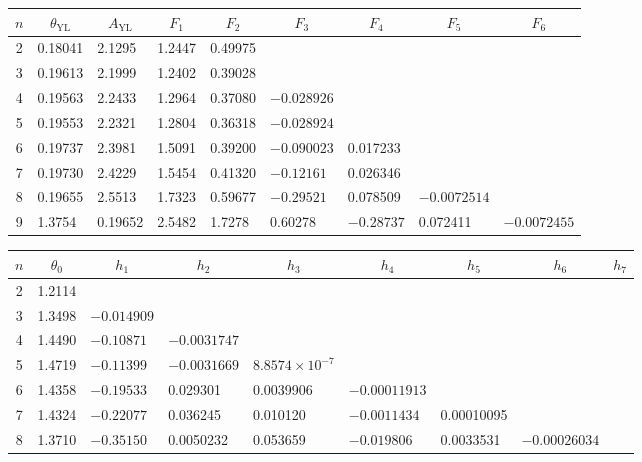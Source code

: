 \documentclass[
aps,
pre,
preprint,
longbibliography,
floatfix
]{revtex4-2}
\begin{document}
\begin{table}
  \singlespacing
  \begin{tabular}{c|llllllll}
    \multicolumn{1}{c|}{$n$} &
     \multicolumn{1}{c}{$\theta_\mathrm{YL}$} &
     \multicolumn{1}{c}{$A_\mathrm{YL}$} &
     \multicolumn{1}{c}{$F_1$} &
     \multicolumn{1}{c}{$F_2$} &
     \multicolumn{1}{c}{$F_3$} &
     \multicolumn{1}{c}{$F_4$} &
     \multicolumn{1}{c}{$F_5$} &
     \multicolumn{1}{c}{$F_6$} \\
    \hline
      2 &
      0.18041 &
      2.1295 &
      1.2447 &
      0.49975 \\
      3 &
      0.19613 &
      2.1999 &
      1.2402 &
      0.39028 \\
      4 &
      0.19563 &
      2.2433 &
      1.2964 &
      0.37080 &
      $-0.028926$ \\
      5 &
      0.19553 &
      2.2321 &
      1.2804 &
      0.36318 &
      $-0.028924$ & & \\
      6 &
      0.19737 &
      2.3981 &
      1.5091 &
      0.39200 &
      $-0.090023$ &
      0.017233 & \\
      7 &
      0.19730 &
      2.4229 &
      1.5454 &
      0.41320 &
      $-0.12161$ &
      0.026346 & \\
      8 &
      0.19655 &
      2.5513 &
      1.7323 &
      0.59677 &
      $-0.29521$ &
      0.078509 &
      $-0.0072514$ \\
      9 &
      1.3754 &
      0.19652 &
      2.5482 &
      1.7278 &
      0.60278 &
      $-0.28737$ &
      0.072411 &
      $-0.0072455$ \\
      \hline
    \end{tabular}
    \begin{tabular}{c|llllllll}
        \hline
      $n$ &
        \multicolumn{1}{c}{$\theta_0$} &
        \multicolumn{1}{c}{$h_1$} &
        \multicolumn{1}{c}{$h_2$} &
        \multicolumn{1}{c}{$h_3$} &
        \multicolumn{1}{c}{$h_4$} &
        \multicolumn{1}{c}{$h_5$} &
        \multicolumn{1}{c}{$h_6$} &
        \multicolumn{1}{c}{$h_7$} \\
      \hline
        2 &
        1.2114 \\
        3 &
      1.3498 &
      $-0.014909$ \\
      4 &
      1.4490 &
      $-0.10871$ & $-0.0031747$ \\
      5 &
      1.4719 &
      $-0.11399$ & $-0.0031669$ & $8.8574\times10^{-7}$ \\
      6 &
      1.4358 &
      $-0.19533$ & 0.029301 & 0.0039906 & $-0.00011913$ \\
      7 &
      1.4324 &
      $-0.22077$ & 0.036245 & 0.010120 & $-0.0011434$ & 0.00010095 \\
      8 &
      1.3710 &
      $-0.35150$ & 0.0050232 & 0.053659 & $-0.019806$ & 0.0033531 & $-0.00026034$ \\
  \end{tabular}
\end{table}
\end{document}
